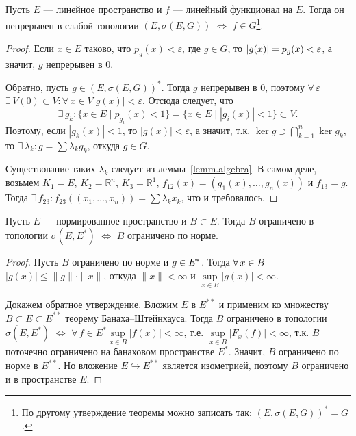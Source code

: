 \documentclass[10pt]{article}
\newcommand*{\p}[1]{#1\nobreak\discretionary{}{\hbox{$\mathsurround=0pt #1$}}{}}
\begin{document}
\begin{theorem}
Пусть $E$ --- линейное пространство и $f$ --- линейный функционал на
$E$. Тогда он непрерывен в слабой топологии $(E,\sigma(E,G))$
$\Leftrightarrow$ $f\in G$\footnote{По другому утверждение теоремы
можно записать так: $(E,\sigma(E,G))^*=G$.}.
\end{theorem}

\begin{proof}
Если $x\in E$ таково, что $p_g(x)<\varepsilon$, где $g\in G$, то
$|g(x)|\p=p_g(x)<\varepsilon$, а значит, $g$ непрерывен в 0.

Обратно, пусть $g\in (E,\sigma(E,G))^*$. Тогда $g$ непрерывен в 0,
поэтому $\forall\,\varepsilon$\;\;$\exists\,V(0)\subset
V:\forall\,x\in V$\;\;$|g(x)|<\varepsilon$. Отсюда следует, что
$$\exists\, g_k:\{x\in E\mid p_{g_i}(x)<1\}=\{x\in E\mid
|g_i(x)|<1\}\subset V.$$ Поэтому, если $|g_k(x)|<1$, то
$|g(x)|<\varepsilon$, а значит, т.к. $\ker g\supset
\bigcap\limits_{k=1}^n\ker g_k$, то $\exists\,
\lambda_k:g=\sum\lambda_kg_k$, откуда $g\in G$.

Существование таких $\lambda_k$ следует из леммы~\ref{lemm.algebra}.
В самом деле, возьмем $K_1=E$, $K_2=\mathbb{R}^n$,
$K_3=\mathbb{R}^1$, $f_{12}(x)=(g_1(x),\ldots,g_n(x))$ и $f_{13}=g$.
Тогда $\exists\,f_{23}:f_{23}((x_1,\ldots,x_n))=\sum\lambda_kx_k$,
что и требовалось.
\end{proof}

\begin{theorem}
Пусть $E$ --- нормированное пространство и $B\subset E$. Тогда $B$
ограничено в топологии $\sigma(E, E^*)$ $\Leftrightarrow$ $B$
ограничено по норме.
\end{theorem}

\begin{proof}
Пусть $B$ ограничено по норме и $g\p\in E^*$. Тогда $\forall\,x\p\in
B$\;\;$|g(x)|\leqslant \|g\|\cdot\|x\|$, откуда $\|x\|<\infty$ и
$\sup\limits_{x\in B}|g(x)|<\infty$.

Докажем обратное утверждение. Вложим $E$ в $E^{**}$ и применим ко
множеству $B\subset E\subset E^{**}$ теорему Банаха--Штейнхауса.
Тогда $B$ ограничено в топологии $\sigma(E,E^*)$ $\Leftrightarrow$
$\forall\,f\in E^*$\;\;$\sup\limits_{x\in B}|f(x)|<\infty$, т.е.
$\sup\limits_{x\in B}|F_x(f)|<\infty$, т.к. $B$ поточечно ограничено
на банаховом пространстве $E^*$. Значит, $B$ ограничено по норме в
$E^{**}$. Но вложение $E\hookrightarrow E^{**}$ является изометрией,
поэтому $B$ ограничено и в пространстве $E$.
\end{proof}
\end{document}
